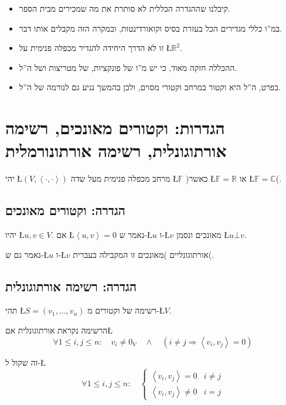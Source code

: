 \documentclass[english,hebrew]{article}
\begin{document}
\begin{itemize}
\item קיבלנו שההגדרה הכללית לא סותרת את מה שמכירים מבית הספר.
\item במ\textquotedblright ו כללי מגדירים הכל בעזרת בסיס וקואורדינטות, ובמקרה
הזה מקבלים אותו דבר.
\item זו לא הדרך היחידה להגדיר מכפלה פנימית על \L{$\mathbb{R}^{2}$}.
\item ההכללה חזקה מאוד, כי יש מ\textquotedblright ו של פונקציות, של מטריצות
ושל ה\textquotedblright ל.
\item בפרט, ה\textquotedblright ל היא וקטור במרחב וקטורי מסוים, ולכן בהמשך
נגיע גם לנורמה של ה\textquotedblright ל.
\end{itemize}

\section{הגדרות: וקטורים מאונכים, רשימה אורתוגונלית, רשימה אורתונורמלית}

יהי \L{$(V,\left\langle \cdot,\cdot\right\rangle )$} מרחב מכפלה פנימית
מעל שדה \L{$\mathbb{F}$} )כאשר \L{$\mathbb{F}=\mathbb{R}$} או \L{$\mathbb{F}=\mathbb{C}$}(.

\subsection{הגדרה: וקטורים מאונכים}

יהיו \L{$u,v\in V$}. אם \L{$\left\langle u,v\right\rangle =0$} נאמר
ש-\L{$u$} ו-\L{$v$} מאונכים ונסמן \L{$u\bot v$}.

נאמר גם ש-\L{$u$} ו-\L{$v$} אורתוגונליים )מאונכים זו המקבילה בעברית(.

\subsection{הגדרה: רשימה אורתוגונלית}

תהי \L{$S=\left(v_{1},\dots,v_{n}\right)$} רשימה של וקטורים מ-\L{$V$}.

הרשימה נקראת אורתוגונלית אם\L{%
\[
\forall1\le i,j\le n:\quad v_{i}\ne0_{V}\quad\wedge\quad\left(i\ne j\Rightarrow\left\langle v_{i},v_{j}\right\rangle =0\right)
\]
}%

זה שקול ל-\L{%
\[
\forall1\le i,j\le n:\quad\begin{cases}
\left\langle v_{i},v_{j}\right\rangle =0 & i\ne j\\
\left\langle v_{i},v_{j}\right\rangle \ne0 & i=j
\end{cases}
\]
}%
\end{document}
